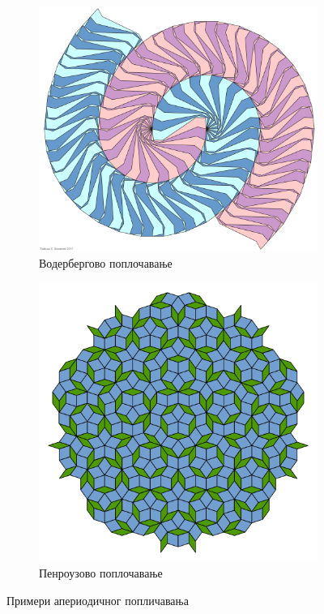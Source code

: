 \documentclass[12pt]{article}
\begin{document}
\begin{figure}[H]

\begin{subfigure}[b]{0.5\textwidth}
    \includegraphics[width=.85\textwidth]{Voderberg.png}
    \caption{Водербергово поплочавање}
    \label{fig:vod}
  \end{subfigure}
  \begin{subfigure}[b]{0.5\textwidth}
    \includegraphics[width=.85\textwidth]{penrouz.png}
    \caption{Пенроузово поплочавање}
    \label{fig:pen}
  \end{subfigure}
  
  \caption{Примери апериодичног попличавања}
  \label{fig:aper}
\end{figure}
\end{document}

